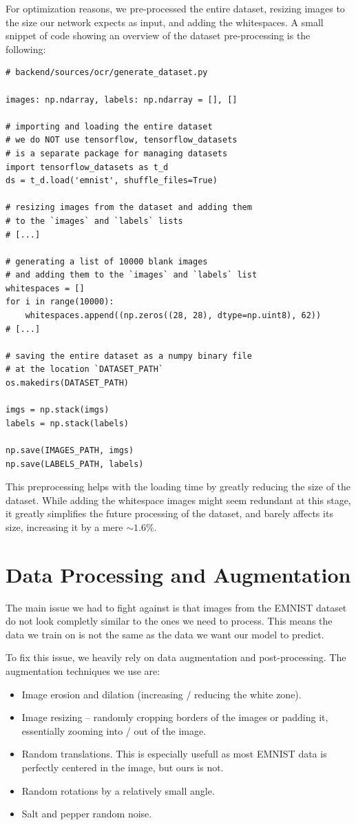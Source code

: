 \documentclass[11pt, a4paper]{report}
\begin{document}
For optimization reasons, we pre-processed the entire dataset, resizing images to the size our network expects as input, and adding the whitespaces. A small snippet of code showing an overview of the dataset pre-processing is the following:


\begin{verbatim}
# backend/sources/ocr/generate_dataset.py

images: np.ndarray, labels: np.ndarray = [], []

# importing and loading the entire dataset
# we do NOT use tensorflow, tensorflow_datasets
# is a separate package for managing datasets
import tensorflow_datasets as t_d
ds = t_d.load('emnist', shuffle_files=True)

# resizing images from the dataset and adding them
# to the `images` and `labels` lists
# [...]

# generating a list of 10000 blank images
# and adding them to the `images` and `labels` list
whitespaces = []
for i in range(10000):
    whitespaces.append((np.zeros((28, 28), dtype=np.uint8), 62))
# [...]

# saving the entire dataset as a numpy binary file
# at the location `DATASET_PATH`
os.makedirs(DATASET_PATH)

imgs = np.stack(imgs)
labels = np.stack(labels)

np.save(IMAGES_PATH, imgs)
np.save(LABELS_PATH, labels)
\end{verbatim}

This preprocessing helps with the loading time by greatly reducing the size of the dataset. While adding the whitespace images might seem redundant at this stage, it greatly simplifies the future processing of the dataset, and barely affects its size, increasing it by a mere $\sim1.6\%$.

\section{Data Processing and Augmentation}

The main issue we had to fight against is that images from the EMNIST dataset do not look completly similar to the ones we need to process. This means the data we train on is not the same as the data we want our model to predict.

To fix this issue, we heavily rely on data augmentation and post-processing. The augmentation techniques we use are:
\begin{itemize}
	\item Image erosion and dilation (increasing / reducing the white zone).
	\item Image resizing -- randomly cropping borders of the images or padding it, essentially zooming into / out of the image.
	\item Random translations. This is especially usefull as most EMNIST data is perfectly centered in the image, but ours is not.
	\item Random rotations by a relatively small angle.
	\item Salt and pepper random noise.
\end{itemize}
\end{document}
